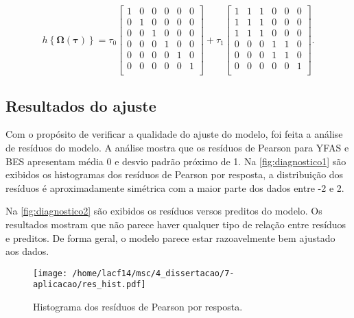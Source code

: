 \begin{equation}
h\left \{ \boldsymbol{\Omega}(\boldsymbol{\tau}) \right \} = 
\tau_0 \begin{bmatrix}
1 & 0 & 0 & 0 & 0 & 0\\ 
0 & 1 & 0 & 0 & 0 & 0\\ 
0 & 0 & 1 & 0 & 0 & 0\\ 
0 & 0 & 0 & 1 & 0 & 0\\ 
0 & 0 & 0 & 0 & 1 & 0\\ 
0 & 0 & 0 & 0 & 0 & 1\\ 
\end{bmatrix} + 
\tau_1 \begin{bmatrix}
1 & 1 & 1 & 0 & 0 & 0\\ 
1 & 1 & 1 & 0 & 0 & 0\\ 
1 & 1 & 1 & 0 & 0 & 0\\ 
0 & 0 & 0 & 1 & 1 & 0\\ 
0 & 0 & 0 & 1 & 1 & 0\\ 
0 & 0 & 0 & 0 & 0 & 1\\ 
\end{bmatrix}.
\end{equation}


\subsection{Resultados do ajuste}

Com o propósito de verificar a qualidade do ajuste do modelo, foi feita a análise de resíduos do modelo. A análise mostra que os resíduos de Pearson para YFAS e BES apresentam média 0 e desvio padrão próximo de 1. Na \autoref{fig:diagnostico1} são exibidos os histogramas dos resíduos de Pearson por resposta, a distribuição dos resíduos é aproximadamente simétrica com a maior parte dos dados entre -2 e 2.

Na \autoref{fig:diagnostico2} são exibidos os resíduos versos preditos do modelo. Os resultados mostram que não parece haver qualquer tipo de relação entre resíduos e preditos. De forma geral, o modelo parece estar razoavelmente bem ajustado aos dados.

\begin{figure}[H]
\centering
\texttt{[image: /home/lacf14/msc/4\_dissertacao/7-aplicacao/res\_hist.pdf]}
\caption{Histograma dos resíduos de Pearson por resposta.}
\label{fig:diagnostico1}
\end{figure}

